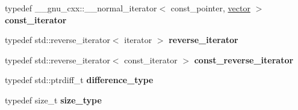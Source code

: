 \begin{DoxyCompactItemize}
\item 
\mbox{\label{classfake_1_1vector_a740ba3e62696efcb1bc381aef4a14e84}} 
typedef \+\_\+\+\_\+gnu\+\_\+cxx\+::\+\_\+\+\_\+normal\+\_\+iterator$<$ const\+\_\+pointer, \mbox{\hyperlink{classfake_1_1vector}{vector}} $>$ {\bfseries const\+\_\+iterator}
\item 
\mbox{\label{classfake_1_1vector_a2dbb8f858c9c091afefa2f2cdb744c5a}} 
typedef std\+::reverse\+\_\+iterator$<$ iterator $>$ {\bfseries reverse\+\_\+iterator}
\item 
\mbox{\label{classfake_1_1vector_a55879623bfe48d2e8e538000f8ec25c8}} 
typedef std\+::reverse\+\_\+iterator$<$ const\+\_\+iterator $>$ {\bfseries const\+\_\+reverse\+\_\+iterator}
\item 
\mbox{\label{classfake_1_1vector_ab400ca25938692afc255744f10dbbd93}} 
typedef std\+::ptrdiff\+\_\+t {\bfseries difference\+\_\+type}
\item 
\mbox{\label{classfake_1_1vector_a640fdc9ee198e6751a2c7b1eda4abb63}} 
typedef size\+\_\+t {\bfseries size\+\_\+type}
\end{DoxyCompactItemize}
